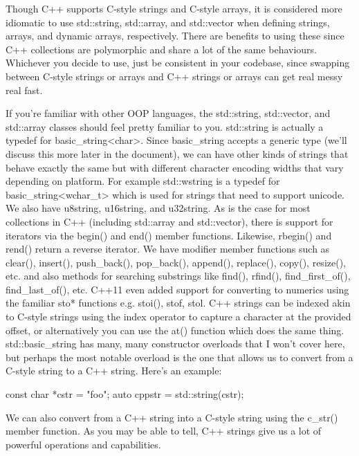 \documentclass{article}
\begin{document}
Though C++ supports C-style strings and C-style arrays, it is considered more idiomatic to use std::string,
std::array, and std::vector when defining strings, arrays, and dynamic arrays, respectively. There are benefits
to using these since C++ collections are polymorphic and share a lot of the same behaviours. Whichever you
decide to use, just be consistent in your codebase, since swapping between C-style strings or arrays and C++
strings or arrays can get real messy real fast.

If you're familiar with other OOP languages, the std::string, std::vector, and std::array classes should feel
pretty familiar to you. std::string is actually a typedef for basic\_string<char>. Since basic\_string accepts
a generic type (we'll discuss this more later in the document), we can have other kinds of strings that behave
exactly the same but with different character encoding widths that vary depending on platform. For example
std::wstring is a typedef for basic\_string<wchar\_t> which is used for strings that need to support unicode.
We also have u8string, u16string, and u32string. As is the case for most collections in C++ (including
std::array and std::vector), there is support for iterators via the begin() and end() member functions.
Likewise, rbegin() and rend() return a reverse iterator. We have modifier member functions such as clear(),
insert(), push\_back(), pop\_back(), append(), replace(), copy(), resize(), etc. and also methods for
searching substrings like find(), rfind(), find\_first\_of(), find\_last\_of(), etc. C++11 even added support
for converting to numerics using the familiar sto* functions e.g. stoi(), stof, stol. C++ strings can be
indexed akin to C-style strings using the index operator to capture a character at the provided offset, or
alternatively you can use the at() function which does the same thing. std::basic\_string has many, many
constructor overloads that I won’t cover here, but perhaps the most notable overload is the one that allows us
to convert from a C-style string to a C++ string. Here’s an example:

\begin{cpplst}
const char *cstr = "foo";
auto cppstr = std::string(cstr);
\end{cpplst}

We can also convert from a C++ string into a C-style string using the c\_str() member function. As you may be
able to tell, C++ strings give us a lot of powerful operations and capabilities.
\end{document}
